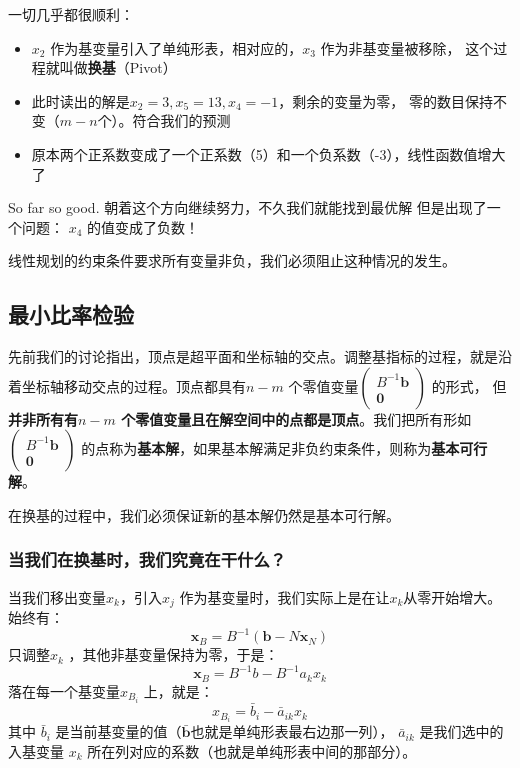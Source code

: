 \documentclass{../mathnotes-art}
\renewcommand{\b}{\mathbf{b}}
\newcommand{\x}{\mathbf{x}}
\begin{document}
一切几乎都很顺利：
\begin{itemize}
    \item \(x_{2}\) 作为基变量引入了单纯形表，相对应的，\(x_{3}\) 作为非基变量被移除，
        这个过程就叫做\textbf{换基}（Pivot）
    \item 此时读出的解是\(x_{2} = 3, x_{5} = 13, x_{4} = -1\)，剩余的变量为零，
        零的数目保持不变（\(m-n\)个）。符合我们的预测
    \item 原本两个正系数变成了一个正系数（5）和一个负系数（-3），线性函数值增大了
\end{itemize}
So far so good. 朝着这个方向继续努力，不久我们就能找到最优解 但是出现了一个问题：
\(x_{4}\) 的值变成了负数！

线性规划的约束条件要求所有变量非负，我们必须阻止这种情况的发生。

\subsection{最小比率检验}

先前我们的讨论指出，顶点是超平面和坐标轴的交点。调整基指标的过程，就是沿着坐标轴移动交点的过程。顶点都具有\(n-m\) 个零值变量\(
    \begin{pmatrix}
        B^{-1} \b \\
        \mathbf{0}
\end{pmatrix}\) 的形式，
但\textbf{并非所有有\(n-m\) 个零值变量且在解空间中的点都是顶点}。我们把所有形如\(
    \begin{pmatrix}
        B^{-1} \b \\
        \mathbf{0}
\end{pmatrix}\) 的点称为\textbf{基本解}，如果基本解满足非负约束条件，则称为\textbf{基本可行解}。

在换基的过程中，我们必须保证新的基本解仍然是基本可行解。

\subsubsection{当我们在换基时，我们究竟在干什么？}

当我们移出变量\(x_{k}\)，引入\(x_{j}\) 作为基变量时，我们实际上是在让\(x_{k}\)从零开始增大。始终有：
\[
    \x_{B} = B^{-1}(\b - N\x_{N})
\]
只调整\(x_{k}\) ，其他非基变量保持为零，于是：
\[
    \x_{B} = B^{-1}b - B^{-1}a_{k} x_{k}
\]
落在每一个基变量\(x_{B_{i}}\) 上，就是：
\[
    x_{B_i} = \bar{b}_i - \bar{a}_{ik} x_k
\]
其中 \(\bar{b}_i\) 是当前基变量的值（\(\bar{\b}\)也就是单纯形表最右边那一列），
\(\bar{a}_{ik}\) 是我们选中的入基变量
\(x_k\) 所在列对应的系数（也就是单纯形表中间的那部分）。
\end{document}
